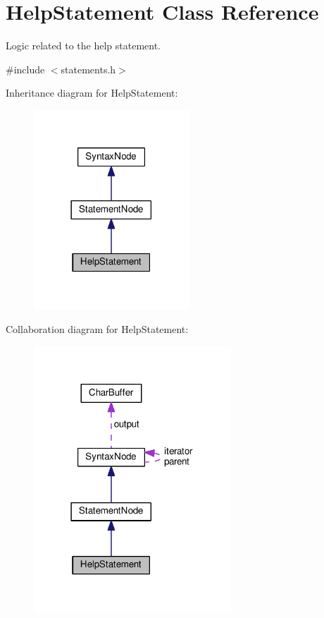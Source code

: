 \hypertarget{classHelpStatement}{}\section{Help\+Statement Class Reference}
\label{classHelpStatement}


Logic related to the help statement.  




{\ttfamily \#include $<$statements.\+h$>$}



Inheritance diagram for Help\+Statement\+:
\nopagebreak
\begin{figure}[H]
\begin{center}
\leavevmode
\includegraphics[width=165pt]{d2/d56/classHelpStatement__inherit__graph}
\end{center}
\end{figure}


Collaboration diagram for Help\+Statement\+:
\nopagebreak
\begin{figure}[H]
\begin{center}
\leavevmode
\includegraphics[width=210pt]{de/d47/classHelpStatement__coll__graph}
\end{center}
\end{figure}
